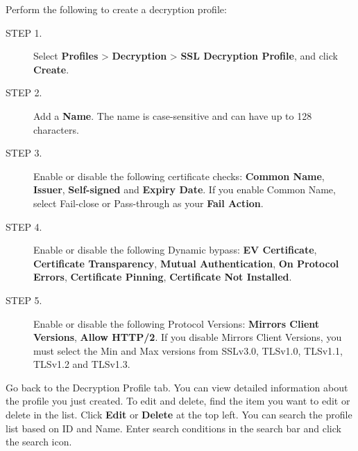 Perform the following to create a decryption profile:

\begin{description}
    \item[STEP 1.]	Select \textbf{Profiles} > \textbf{Decryption} > \textbf{SSL Decryption Profile}, and click \textbf{Create}.
    \item[STEP 2.]	Add a \textbf{Name}. The name is case-sensitive and can have up to 128 characters.
    \item[STEP 3.]	Enable or disable the following certificate checks: \textbf{Common Name}, \textbf{Issuer}, \textbf{Self-signed} and \textbf{Expiry Date}. If you enable Common Name, select Fail-close or Pass-through as your \textbf{Fail Action}. 
    \item[STEP 4.]	Enable or disable the following Dynamic bypass: \textbf{EV Certificate}, \textbf{Certificate Transparency}, \textbf{Mutual Authentication}, \textbf{On Protocol Errors}, \textbf{Certificate Pinning}, \textbf{Certificate Not Installed}.
    \item[STEP 5.]	Enable or disable the following Protocol Versions: \textbf{Mirrors Client Versions}, \textbf{Allow HTTP/2}. If you disable Mirrors Client Versions, you must select the Min and Max versions from SSLv3.0, TLSv1.0, TLSv1.1, TLSv1.2 and TLSv1.3.
\end{description} 

Go back to the Decryption Profile tab. You can view detailed information about the profile you just created. To edit and delete, find the item you want to edit or delete in the list. 
Click \textbf{Edit} or \textbf{Delete} at the top left. You can search the profile list based on ID and Name. Enter search conditions in the search bar and click the search icon.
